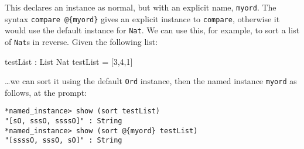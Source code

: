 \noindent
This declares an instance as normal, but with an explicit name, \texttt{myord}.
The syntax \texttt{compare @\{myord\}} gives an explicit instance to \texttt{compare}, otherwise it would use the default instance for \texttt{Nat}.
We can use this, for example, to sort a list of \texttt{Nat}s in reverse.
Given the following list:

\begin{code}
testList : List Nat
testList = [3,4,1]
\end{code}

\noindent
\ldots we can sort it using the default \texttt{Ord} instance, then the named instance \texttt{myord} as follows, at the \Idris{} prompt:

\begin{lstlisting}[style=stdout]
*named_instance> show (sort testList)
"[sO, sssO, ssssO]" : String
*named_instance> show (sort @{myord} testList)
"[ssssO, sssO, sO]" : String
\end{lstlisting}

